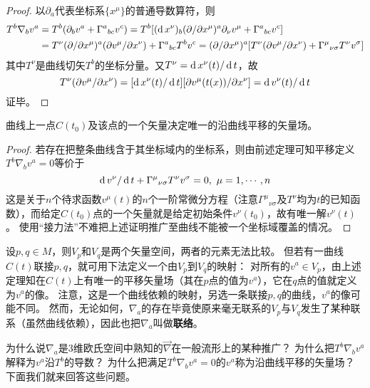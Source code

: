 \begin{proof}
以$\partial_a$代表坐标系$\{x^\mu\}$的普通导数算符，则
$$\begin{aligned}
T^b\nabla_bv^a & = T^b(\partial_bv^a + \Gamma^a{}_{bc}v^c) = T^b[(\operatorname{d} x^\nu)_b(\partial / \partial x^\mu)^a\partial_\nu v^\mu + \Gamma^a{}_{bc}v^c] \\
& = T^\nu(\partial / \partial x^\mu)^a(\partial v^\mu / \partial x^\nu) + \Gamma^a{}_{bc}T^bv^c = (\partial / \partial x^\mu)^a[T^\nu(\partial v^\mu / \partial x^\nu) + \Gamma^\mu{}_{\nu\sigma}T^\nu v^\sigma]
\end{aligned}$$
其中$T^\nu$是曲线切矢$T^b$的坐标分量。又$T^\nu = \operatorname{d} x^\nu(t) / \operatorname{d} t$，故
$$T^\nu(\partial v^\mu / \partial x^\nu) = [\operatorname{d} x^\nu(t) / \operatorname{d} t][\partial v^\mu(t(x)) / \partial x^\nu] = \operatorname{d} v^\nu(t) / \operatorname{d} t$$
证毕。
\end{proof}

\begin{theorem}
曲线上一点$C(t_0)$及该点的一个矢量决定唯一的沿曲线平移的矢量场。
\end{theorem}

\begin{proof}
若存在把整条曲线含于其坐标域内的坐标系，则由前述定理可知平移定义$T^b\nabla_bv^a = 0$等价于
$$\operatorname{d} v^\nu / \operatorname{d} t + \Gamma^\mu{}_{\nu\sigma}T^\nu v^\sigma = 0, ~ \mu = 1, \cdots, n$$
这是关于$n$个待求函数$v^\mu(t)$的$n$个一阶常微分方程（注意$\Gamma^\mu{}_{\nu\sigma}$及$T^\nu$均为$t$的已知函数），而给定$C(t_0)$点的一个矢量就是给定初始条件$v^\nu(t_0)$，故有唯一解$v^\nu(t)$。
使用``接力法''不难把上述证明推广至曲线不能被一个坐标域覆盖的情况。
\end{proof}

设$p, q \in M$，则$V_p$和$V_q$是两个矢量空间，两者的元素无法比较。
但若有一曲线$C(t)$联接$p, q$，就可用下法定义一个由$V_p$到$V_q$的映射：
对所有的$v^a \in V_p$，由上述定理知在$C(t)$上有唯一的平移矢量场（其在$p$点的值为$v^a$），它在$q$点的值就定义为$v^a$的像。
注意，这是一个曲线依赖的映射，另选一条联接$p, q$的曲线，$v^a$的像可能不同。
然而，无论如何，$\nabla_a$的存在毕竟使原来毫无联系的$V_p$与$V_q$发生了某种联系（虽然曲线依赖），因此也把$\nabla_a$叫做\textbf{联络}。

为什么说$\nabla_a$是$3$维欧氏空间中熟知的$\vec{\nabla}$在一般流形上的某种推广？
为什么把$T^b\nabla_bv^a$解释为$v^a$沿$T^b$的导数？
为什么把满足$T^b\nabla_bv^a = 0$的$v^a$称为沿曲线平移的矢量场？
下面我们就来回答这些问题。

